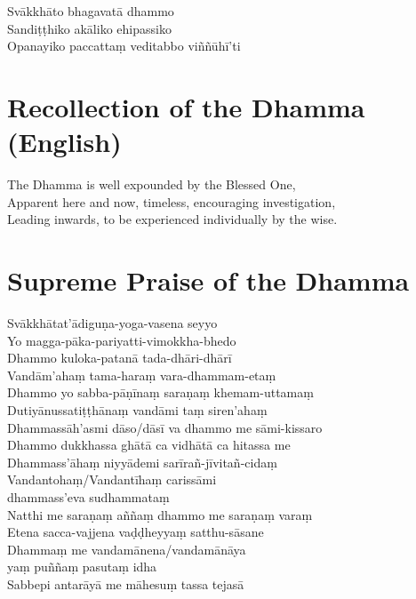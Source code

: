 \begin{leader}
\end{leader}

Svākkhāto bhagavatā dhammo\\
Sandiṭṭhiko akāliko ehipassiko\\
Opanayiko paccattaṃ veditabbo viññūhī'ti

\section*{Recollection of the Dhamma (English)}

\begin{leader}
\end{leader}

The Dhamma is well expounded by the Blessed One,\\
Apparent here and now, timeless, encouraging investigation,\\
Leading inwards, to be experienced individually by the wise.

\section*{Supreme Praise of the Dhamma}

\begin{leader}
\end{leader}

Svākkhātat'ādiguṇa-yoga-vasena seyyo\\
Yo magga-pāka-pariyatti-vimokkha-bhedo\\
Dhammo kuloka-patanā tada-dhāri-dhārī\\
Vandām'ahaṃ tama-haraṃ vara-dhammam-etaṃ\\
Dhammo yo sabba-pāṇīnaṃ saraṇaṃ khemam-uttamaṃ\\
Dutiyānussatiṭṭhānaṃ vandāmi taṃ siren'ahaṃ\\
Dhammassāh'asmi dāso/dāsī va dhammo me sāmi-kissaro\\
Dhammo dukkhassa ghātā ca vidhātā ca hitassa me\\
Dhammass'āhaṃ niyyādemi sarīrañ-jīvitañ-cidaṃ\\
Vandantohaṃ/Vandantīhaṃ carissāmi\\
\vin dhammass'eva sudhammataṃ\\
Natthi me saraṇaṃ aññaṃ dhammo me saraṇaṃ varaṃ\\
Etena sacca-vajjena vaḍḍheyyaṃ satthu-sāsane\\
Dhammaṃ me vandamānena/vandamānāya\\
\vin yaṃ puññaṃ pasutaṃ idha\\
Sabbepi antarāyā me māhesuṃ tassa tejasā

